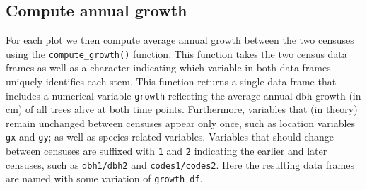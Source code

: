 \documentclass[12pt]{article}
\newenvironment{Shaded}{\begin{snugshade}}{\end{snugshade}}
\newcommand{\DataTypeTok}[1]{\textcolor[rgb]{0.13,0.29,0.53}{#1}}
\newcommand{\DecValTok}[1]{\textcolor[rgb]{0.00,0.00,0.81}{#1}}
\newcommand{\KeywordTok}[1]{\textcolor[rgb]{0.13,0.29,0.53}{\textbf{#1}}}
\newcommand{\NormalTok}[1]{#1}
\newcommand{\OperatorTok}[1]{\textcolor[rgb]{0.81,0.36,0.00}{\textbf{#1}}}
\newcommand{\StringTok}[1]{\textcolor[rgb]{0.31,0.60,0.02}{#1}}
\begin{document}
\begin{Shaded}
\end{Shaded}

\hypertarget{compute-annual-growth}{%
\subsection{Compute annual growth}\label{compute-annual-growth}}

For each plot we then compute average annual growth between the two
censuses using the \texttt{compute\_growth()} function. This function
takes the two census data frames as well as a character indicating which
variable in both data frames uniquely identifies each stem. This
function returns a single data frame that includes a numerical variable
\texttt{growth} reflecting the average annual dbh growth (in cm) of all
trees alive at both time points. Furthermore, variables that (in theory)
remain unchanged between censuses appear only once, such as location
variables \texttt{gx} and \texttt{gy}; as well as species-related
variables. Variables that should change between censuses are suffixed
with \texttt{1} and \texttt{2} indicating the earlier and later
censuses, such as \texttt{dbh1/dbh2} and \texttt{codes1/codes2}. Here
the resulting data frames are named with some variation of
\texttt{growth\_df}.
\end{document}
